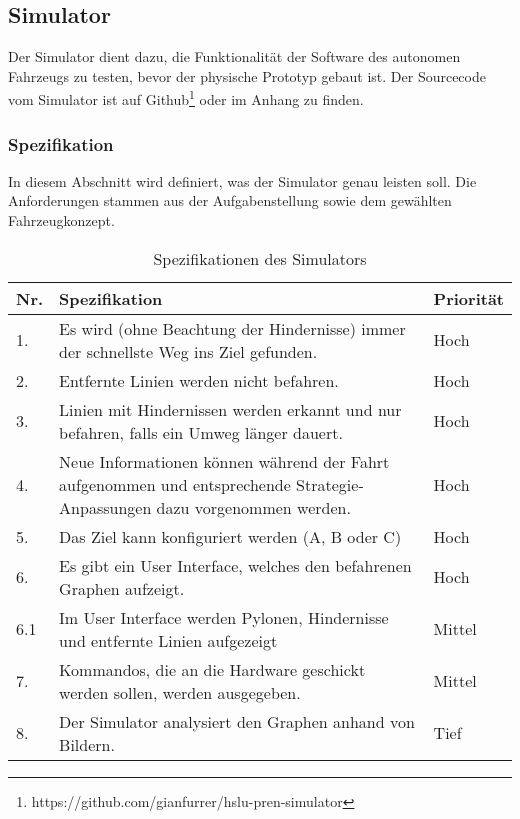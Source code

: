 \documentclass[../main.tex]{subfiles}
\begin{document}
\newpage
\subsection{Simulator}\label{simulator}

Der Simulator dient dazu, die Funktionalität der Software des autonomen Fahrzeugs zu testen, bevor der physische Prototyp gebaut ist.
Der Sourcecode vom Simulator ist auf Github\footnote{https://github.com/gianfurrer/hslu-pren-simulator} oder im Anhang zu finden.

\subsubsection{Spezifikation}

In diesem Abschnitt wird definiert, was der Simulator genau leisten soll. Die Anforderungen stammen aus der Aufgabenstellung sowie dem gewählten Fahrzeugkonzept.

\begin{table}[htbp!]
    \centering
    \begin{tabularx}{\textwidth}{| l | X | l |}
        \hline
        \textbf{Nr.} & \textbf{Spezifikation} & \textbf{Priorität} \\ \hline
        1. & Es wird (ohne Beachtung der Hindernisse) immer der schnellste Weg ins Ziel gefunden. & Hoch \\ \hline
        2. & Entfernte Linien werden nicht befahren. & Hoch \\ \hline
        3. & Linien mit Hindernissen werden erkannt und nur befahren, falls ein Umweg länger dauert. & Hoch \\ \hline
        4. & Neue Informationen können während der Fahrt aufgenommen und entsprechende Strategie-Anpassungen dazu vorgenommen werden. & Hoch \\ \hline
        5. & Das Ziel kann konfiguriert werden (A, B oder C) & Hoch \\ \hline
        6. & Es gibt ein User Interface, welches den befahrenen Graphen aufzeigt. & Hoch \\ \hline
        6.1 & Im User Interface werden Pylonen, Hindernisse und entfernte Linien aufgezeigt & Mittel \\ \hline
        7. & Kommandos, die an die Hardware geschickt werden sollen, werden ausgegeben. & Mittel \\ \hline
        8. & Der Simulator analysiert den Graphen anhand von Bildern. & Tief \\ \hline
    \end{tabularx}
    \caption{Spezifikationen des Simulators}
\end{table}
\end{document}
